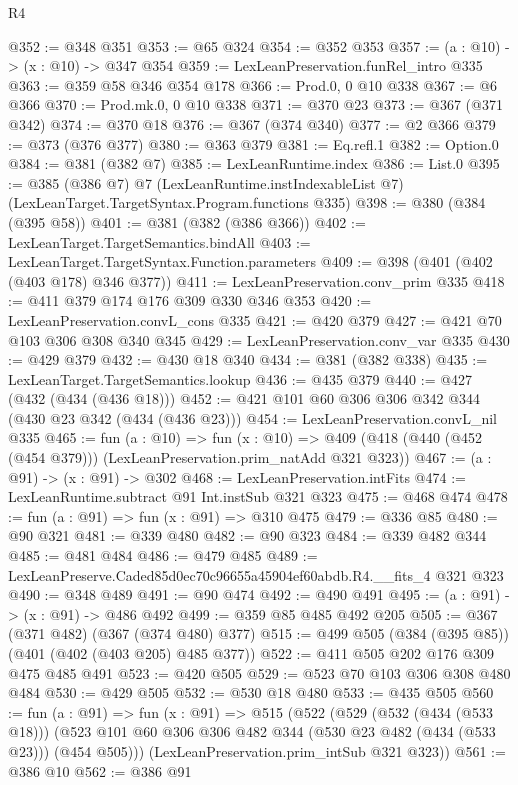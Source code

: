 \begin{lexlean}{R4}
\begin{coremodule}
@352 := @348 @351
@353 := @65 @324
@354 := @352 @353
@357 := (a : @10) -> (x : @10) -> @347 @354
@359 := LexLeanPreservation.funRel_intro @335
@363 := @359 @58 @346 @354 @178
@366 := Prod.{0, 0} @10 @338
@367 := @6 @366
@370 := Prod.mk.{0, 0} @10 @338
@371 := @370 @23
@373 := @367 (@371 @342)
@374 := @370 @18
@376 := @367 (@374 @340)
@377 := @2 @366
@379 := @373 (@376 @377)
@380 := @363 @379
@381 := Eq.refl.{1}
@382 := Option.{0}
@384 := @381 (@382 @7)
@385 := LexLeanRuntime.index
@386 := List.{0}
@395 := @385
    (@386 @7)
    @7
    (LexLeanRuntime.instIndexableList @7)
    (LexLeanTarget.TargetSyntax.Program.functions @335)
@398 := @380 (@384 (@395 @58))
@401 := @381 (@382 (@386 @366))
@402 := LexLeanTarget.TargetSemantics.bindAll
@403 := LexLeanTarget.TargetSyntax.Function.parameters
@409 := @398 (@401 (@402 (@403 @178) @346 @377))
@411 := LexLeanPreservation.conv_prim @335
@418 := @411 @379 @174 @176 @309 @330 @346 @353
@420 := LexLeanPreservation.convL_cons @335
@421 := @420 @379
@427 := @421 @70 @103 @306 @308 @340 @345
@429 := LexLeanPreservation.conv_var @335
@430 := @429 @379
@432 := @430 @18 @340
@434 := @381 (@382 @338)
@435 := LexLeanTarget.TargetSemantics.lookup
@436 := @435 @379
@440 := @427 (@432 (@434 (@436 @18)))
@452 := @421 @101 @60 @306 @306 @342 @344 (@430 @23 @342 (@434 (@436 @23)))
@454 := LexLeanPreservation.convL_nil @335
@465 := fun (a : @10) =>
  fun (x : @10) => @409 (@418 (@440 (@452 (@454 @379))) (LexLeanPreservation.prim_natAdd @321 @323))
@467 := (a : @91) -> (x : @91) -> @302
@468 := LexLeanPreservation.intFits
@474 := LexLeanRuntime.subtract @91 Int.instSub @321 @323
@475 := @468 @474
@478 := fun (a : @91) => fun (x : @91) => @310 @475
@479 := @336 @85
@480 := @90 @321
@481 := @339 @480
@482 := @90 @323
@484 := @339 @482 @344
@485 := @481 @484
@486 := @479 @485
@489 := LexLeanPreserve.Caded85d0ec70c96655a45904ef60abdb.R4.__fits_4 @321 @323
@490 := @348 @489
@491 := @90 @474
@492 := @490 @491
@495 := (a : @91) -> (x : @91) -> @486 @492
@499 := @359 @85 @485 @492 @205
@505 := @367 (@371 @482) (@367 (@374 @480) @377)
@515 := @499 @505 (@384 (@395 @85)) (@401 (@402 (@403 @205) @485 @377))
@522 := @411 @505 @202 @176 @309 @475 @485 @491
@523 := @420 @505
@529 := @523 @70 @103 @306 @308 @480 @484
@530 := @429 @505
@532 := @530 @18 @480
@533 := @435 @505
@560 := fun (a : @91) =>
  fun (x : @91) =>
  @515
    (@522
      (@529
        (@532 (@434 (@533 @18)))
        (@523 @101 @60 @306 @306 @482 @344 (@530 @23 @482 (@434 (@533 @23))) (@454 @505)))
      (LexLeanPreservation.prim_intSub @321 @323))
@561 := @386 @10
@562 := @386 @91

\end{coremodule}
\end{lexlean}
